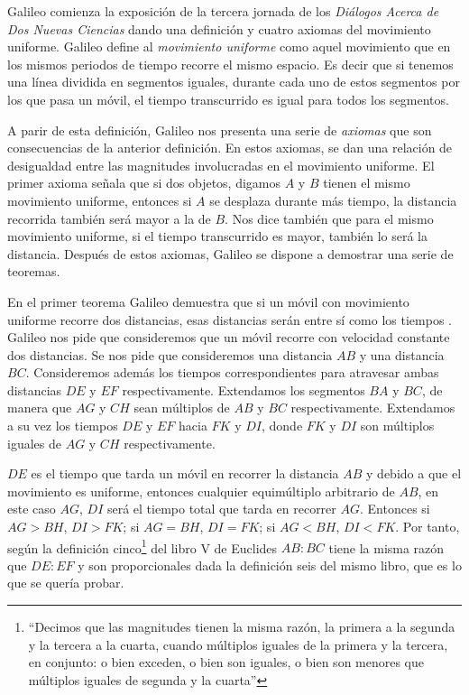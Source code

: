 Galileo comienza la exposición de la tercera jornada de los \emph{Diálogos Acerca de Dos Nuevas Ciencias} dando una definición y cuatro axiomas del movimiento uniforme. Galileo define al \textit{movimiento uniforme} como aquel movimiento que en los mismos periodos de tiempo recorre el mismo espacio. Es decir que si tenemos una línea dividida en segmentos iguales, durante cada uno de estos segmentos por los que pasa un móvil, el tiempo transcurrido es igual para todos los segmentos.

A parir de esta definición, Galileo nos presenta una serie de \textit{axiomas} que son consecuencias de la anterior definición. En estos axiomas, se dan una relación de desigualdad entre las magnitudes involucradas en el movimiento uniforme. El primer axioma señala que si dos objetos, digamos $A$ y $B$ tienen el mismo movimiento uniforme, entonces si $A$ se desplaza durante más tiempo, la distancia recorrida también será mayor a la de $B$. Nos dice también que para el mismo movimiento uniforme, si el tiempo transcurrido es mayor, también lo será la distancia. Después de estos axiomas, Galileo se dispone a demostrar una serie de teoremas.

En el primer teorema Galileo demuestra que si un móvil con movimiento uniforme recorre dos distancias, esas distancias serán entre sí como los tiempos \cite[p. 215]{galtre}. Galileo nos pide que consideremos que un móvil recorre con velocidad constante dos distancias. Se nos pide que consideremos una distancia $AB$ y una distancia $BC$. Consideremos además los tiempos correspondientes para atravesar ambas distancias $DE$ y $EF$ respectivamente. Extendamos los segmentos $BA$ y $BC$, de manera que $AG$ y $CH$ sean múltiplos de $AB$ y $BC$ respectivamente. Extendamos a su vez los tiempos $DE$ y $EF$ hacia $FK$ y $DI$, donde $FK$ y $DI$ son múltiplos iguales de $AG$ y $CH$ respectivamente.

$DE$ es el tiempo que tarda un móvil en recorrer la distancia $AB$ y debido a que el movimiento es uniforme, entonces cualquier equimúltiplo arbitrario de $AB$, en este caso $AG$, $DI$ será el tiempo total que tarda en recorrer $AG$. Entonces si $AG > BH$, $DI > FK$; si $AG = BH$, $DI = FK$; si $AG < BH$, $DI < FK$. Por tanto, según la definición cinco\footnote{``Decimos que las magnitudes tienen la misma razón, la primera a la segunda y  la tercera a la cuarta, cuando múltiplos iguales de la primera y la tercera, en conjunto: o bien exceden, o bien son iguales, o bien son menores que múltiplos iguales de segunda y la cuarta''} del libro V de Euclides \cite{Euclides1956} $AB:BC$ tiene la misma razón que $DE:EF$ y son proporcionales dada la definición seis del mismo libro, que es lo que se quería probar.

